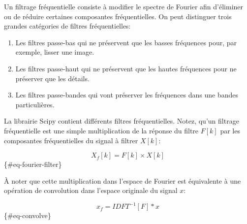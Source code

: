 \documentclass[11pt]{article}
\begin{document}
Un filtrage fréquentielle consiste à modifier le spectre de Fourier afin
d'éliminer ou de réduire certaines composantes fréquentielles. On peut
distinguer trois grandes catégories de filtres fréquentielles:

\begin{enumerate}
\def\labelenumi{\arabic{enumi}.}
\item
  Les filtres passe-bas qui ne préservent que les basses fréquences
  pour, par exemple, lisser une image.
\item
  Les filtres passe-haut qui ne préservent que les hautes fréquences
  pour ne préserver que les détails.
\item
  Les filtres passe-bandes qui vont préserver les fréquences dans une
  bandes particulières.
\end{enumerate}

La librairie Scipy contient différents filtres fréquentielles. Notez,
qu'un filtrage fréquentielle est une simple multiplication de la réponse
du filtre \(F[k]\) par les composantes fréquentielles du signal à
filtrer \(X[k]\):

\[
X_f[k] = F[k] \times X[k]
\] \{\#eq-fourier-filter\}

À noter que cette multiplication dans l'espace de Fourier est
équivalente à une opération de convolution dans l'espace originale du
signal \(x\):

\[
x_f = IDFT^{-1}[F]*x
\] \{\#eq-convolve\}
\end{document}
